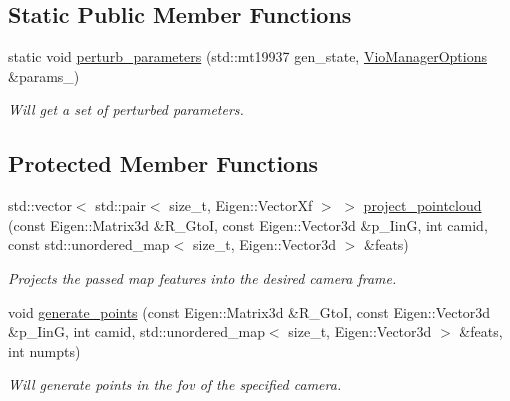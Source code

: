 \subsection*{Static Public Member Functions}
\begin{DoxyCompactItemize}
\item 
static void \hyperlink{classov__msckf_1_1Simulator_ab7b38fccf364b602eef8294524f3f30a}{perturb\+\_\+parameters} (std\+::mt19937 gen\+\_\+state, \hyperlink{structov__msckf_1_1VioManagerOptions}{Vio\+Manager\+Options} \&params\+\_\+)
\begin{DoxyCompactList}\small\item\em Will get a set of perturbed parameters. \end{DoxyCompactList}\end{DoxyCompactItemize}
\subsection*{Protected Member Functions}
\begin{DoxyCompactItemize}
\item 
std\+::vector$<$ std\+::pair$<$ size\+\_\+t, Eigen\+::\+Vector\+Xf $>$ $>$ \hyperlink{classov__msckf_1_1Simulator_a1c6947099892bd64e2bad9b4c9303226}{project\+\_\+pointcloud} (const Eigen\+::\+Matrix3d \&R\+\_\+\+GtoI, const Eigen\+::\+Vector3d \&p\+\_\+\+IinG, int camid, const std\+::unordered\+\_\+map$<$ size\+\_\+t, Eigen\+::\+Vector3d $>$ \&feats)
\begin{DoxyCompactList}\small\item\em Projects the passed map features into the desired camera frame. \end{DoxyCompactList}\item 
void \hyperlink{classov__msckf_1_1Simulator_a511b2edf20545972ced008fddb0654ae}{generate\+\_\+points} (const Eigen\+::\+Matrix3d \&R\+\_\+\+GtoI, const Eigen\+::\+Vector3d \&p\+\_\+\+IinG, int camid, std\+::unordered\+\_\+map$<$ size\+\_\+t, Eigen\+::\+Vector3d $>$ \&feats, int numpts)
\begin{DoxyCompactList}\small\item\em Will generate points in the fov of the specified camera. \end{DoxyCompactList}\end{DoxyCompactItemize}
